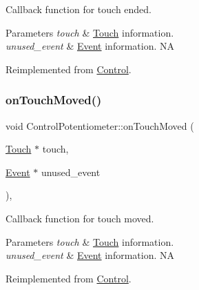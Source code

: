 Callback function for touch ended.


\begin{DoxyParams}{Parameters}
{\em touch} & \hyperlink{classTouch}{Touch} information. \\
\hline
{\em unused\+\_\+event} & \hyperlink{classEvent}{Event} information.  NA \\
\hline
\end{DoxyParams}


Reimplemented from \hyperlink{classControl_a56073e57060169fe80cbb6ce1f4abe28}{Control}.

\mbox{\label{classControlPotentiometer_aedfddc1d724a15c31897a50eaf1b93e6}} 
\subsubsection{\texorpdfstring{on\+Touch\+Moved()}{onTouchMoved()}\hspace{0.1cm}{\footnotesize\ttfamily [1/2]}}
{\footnotesize\ttfamily void Control\+Potentiometer\+::on\+Touch\+Moved (\begin{DoxyParamCaption}\item[{\hyperlink{classTouch}{Touch} $\ast$}]{touch,  }\item[{\hyperlink{classEvent}{Event} $\ast$}]{unused\+\_\+event }\end{DoxyParamCaption})\hspace{0.3cm}{\ttfamily [override]}, {\ttfamily [virtual]}}

Callback function for touch moved.


\begin{DoxyParams}{Parameters}
{\em touch} & \hyperlink{classTouch}{Touch} information. \\
\hline
{\em unused\+\_\+event} & \hyperlink{classEvent}{Event} information.  NA \\
\hline
\end{DoxyParams}


Reimplemented from \hyperlink{classControl_a26d2e6af053319dc605949678f726622}{Control}.

\mbox{\label{classControlPotentiometer_a5da1557dea949b31c82c56ed7aef23eb}} 

